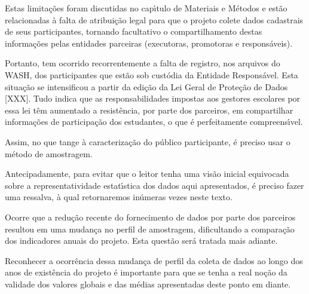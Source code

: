 \documentclass[
12pt,		%
openright,	%
twoside,  %
a4paper,			%
chapter=TITLE,		%
english,			%
french,				%
spanish,			%
brazil				%
]{USPSC-classe/USPSC_RedarTex}
\begin{document}
Estas limita\c{c}\~oes foram discutidas no cap\'{\i}tulo de Materiais e M\'etodos e est\~ao relacionadas \`a falta de atribui\c{c}\~ao legal para que o projeto colete dados cadastrais de seus participantes, tornando facultativo o compartilhamento destas informa\c{c}\~oes pelas entidades parceiras (executoras, promotoras e respons\'aveis).








Portanto, tem ocorrido recorrentemente a falta de registro, nos arquivos do WASH, dos participantes que est\~ao sob cust\'odia da Entidade Respons\'avel. Esta situa\c{c}\~ao se intensificou a partir da edi\c{c}\~ao da Lei Geral de Prote\c{c}\~ao de Dados [XXX]. Tudo indica que as responsabilidades impostas aos gestores escolares por essa lei t\^em aumentado a  resist\^encia, por parte dos parceiros, em compartilhar informa\c{c}\~oes de participa\c{c}\~ao dos estudantes, o que \'e perfeitamente compreens\'{\i}vel.








Assim, no que tange \`a caracteriza\c{c}\~ao do p\'ublico participante, \'e preciso usar o m\'etodo de amostragem.








Antecipadamente, para evitar que o leitor tenha uma vis\~ao inicial equivocada sobre a representatividade estat\'{\i}stica dos dados aqui apresentados, \'e preciso fazer uma ressalva, \`a qual retornaremos in\'umeras vezes neste texto.








Ocorre que a redu\c{c}\~ao recente do fornecimento de dados por parte dos parceiros resultou em uma mudan\c{c}a no perfil de amostragem, dificultando a compara\c{c}\~ao dos indicadores anuais do projeto. Esta quest\~ao ser\'a tratada mais adiante.








Reconhecer a ocorr\^encia dessa mudan\c{c}a de perfil da coleta de dados ao longo dos anos de exist\^encia do projeto \'e importante para que se tenha a real no\c{c}\~ao da validade dos valores globais e das m\'edias apresentadas deste ponto em diante.
\end{document}
